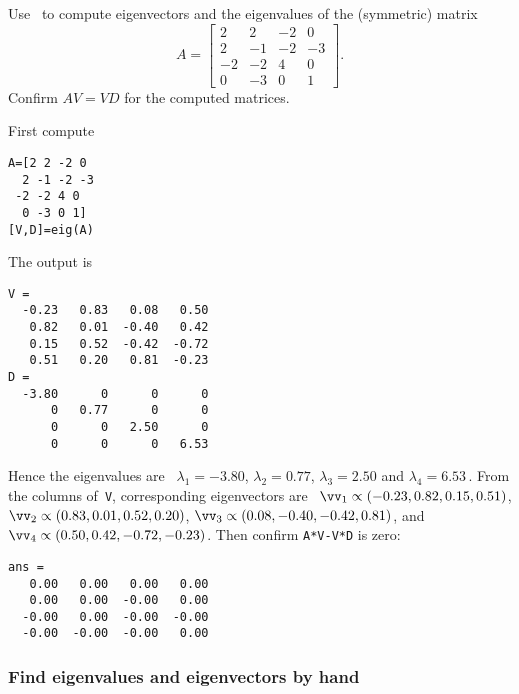 \begin{example} 
Use \script\ to compute eigenvectors and the eigenvalues of the (symmetric) matrix
\begin{equation*}
A=\begin{bmatrix} 2&2&-2&0
\\2&-1&-2&-3
\\-2&-2&4&0
\\0&-3&0&1
 \end{bmatrix}.
\end{equation*}
Confirm \(AV=VD\) for the computed matrices.
\begin{solution} 
First compute
\setbox\ajrqrbox\hbox{}%
\marginajrbox%
\begin{verbatim}
A=[2 2 -2 0
  2 -1 -2 -3
 -2 -2 4 0
  0 -3 0 1]
[V,D]=eig(A)
\end{verbatim}
The output is \twodp
\begin{verbatim}
V =
  -0.23   0.83   0.08   0.50
   0.82   0.01  -0.40   0.42
   0.15   0.52  -0.42  -0.72
   0.51   0.20   0.81  -0.23
D =
  -3.80      0      0      0
      0   0.77      0      0
      0      0   2.50      0
      0      0      0   6.53
\end{verbatim}
Hence the eigenvalues are \twodp\ \(\lambda_1=-3.80\), \(\lambda_2=0.77\), \(\lambda_3=2.50\) and \(\lambda_4=6.53\)\,.
From the columns of~\verb|V|, corresponding eigenvectors are \twodp\  
\(\vv_1\propto(-0.23,0.82,0.15,0.51)\),
\(\vv_2\propto(0.83,0.01,0.52,0.20)\),
\(\vv_3\propto(0.08,-0.40,-0.42,0.81)\), and
\(\vv_4\propto(0.50,0.42,-0.72,-0.23)\).
Then confirm \verb|A*V-V*D| is zero:
\begin{verbatim}
ans =
   0.00   0.00   0.00   0.00
   0.00   0.00  -0.00   0.00
  -0.00   0.00  -0.00  -0.00
  -0.00  -0.00  -0.00   0.00
\end{verbatim}
\end{solution}
\end{example}








\subsubsection{Find eigenvalues and eigenvectors by hand}
\label{sec:feebh}

